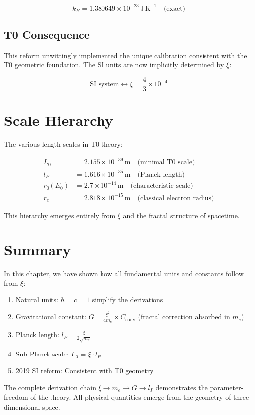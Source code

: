 \begin{equation}
	k_B = 1.380649 \times 10^{-23}\,\text{J}\,\text{K}^{-1} \quad \text{(exact)}
	\label{eq:boltzmann_exact}
\end{equation}

\subsection{T0 Consequence}

This reform unwittingly implemented the unique calibration consistent with 
the T0 geometric foundation. The SI units are now implicitly determined 
by $\xi$:

\begin{equation}
	\text{SI system} \leftrightarrow \xi = \frac{4}{3} \times 10^{-4}
	\label{eq:si_xi_connection}
\end{equation}

\section{Scale Hierarchy}

The various length scales in T0 theory:

\begin{align}
	L_0 &= 2.155 \times 10^{-39}\,\text{m} \quad \text{(minimal T0 scale)} \\
	l_P &= 1.616 \times 10^{-35}\,\text{m} \quad \text{(Planck length)} \\
	r_0(E_0) &= 2.7 \times 10^{-14}\,\text{m} \quad \text{(characteristic scale)} \\
	r_e &= 2.818 \times 10^{-15}\,\text{m} \quad \text{(classical electron radius)}
\end{align}

This hierarchy emerges entirely from $\xi$ and the fractal structure 
of spacetime.

\section{Summary}

In this chapter, we have shown how all fundamental units and constants 
follow from $\xi$:

\begin{enumerate}
	\item Natural units: $\hbar = c = 1$ simplify the derivations
	\item Gravitational constant: $G = \frac{\xi^2}{4m_e} \times C_{\text{conv}}$ (fractal correction absorbed in $m_e$)
	\item Planck length: $l_P = \frac{\xi}{2\sqrt{m_e}}$
	\item Sub-Planck scale: $L_0 = \xi \cdot l_P$
	\item 2019 SI reform: Consistent with T0 geometry
\end{enumerate}

The complete derivation chain $\xi \to m_e \to G \to l_P$ demonstrates the 
parameter-freedom of the theory. All physical quantities emerge from the 
geometry of three-dimensional space.